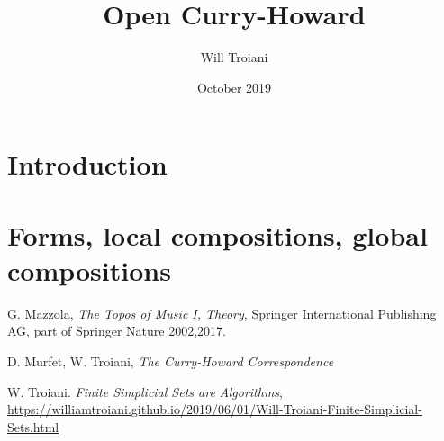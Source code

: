 \documentclass[12pt]{article}
\title{Open Curry-Howard}
\author{Will Troiani}
\date{October 2019}
\numberwithin{thm}{subsection}
\numberwithin{defn}{subsection}
\numberwithin{lemma}{subsection}
\numberwithin{example}{subsection}
\numberwithin{notation}{subsection}
\numberwithin{cor}{subsection}
\numberwithin{remark}{subsection}
\numberwithin{condition}{subsection}
\numberwithin{question}{subsection}
\numberwithin{question}{subsection}
\begin{document}
 \section{Introduction}
 
 
 \section{Forms, local compositions, global compositions}
 
 
 \begin{thebibliography}{9}
  G. Mazzola, \emph{The Topos of Music I, Theory}, Springer International Publishing AG, part of Springer Nature 2002,2017.
 
  D. Murfet, W. Troiani, \emph{The Curry-Howard Correspondence}
 
  W. Troiani. \emph{Finite Simplicial Sets are Algorithms}, \url{https://williamtroiani.github.io/2019/06/01/Will-Troiani-Finite-Simplicial-Sets.html}
 \end{thebibliography}
 
 
 
 
\end{document}
